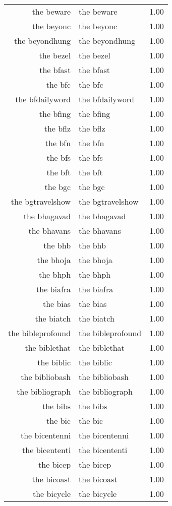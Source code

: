 \begin{table}[ht]
\begin{tabular}{rlr}
  the beware & the beware & 1.00 \\ 
  the beyonc & the beyonc & 1.00 \\ 
  the beyondhung & the beyondhung & 1.00 \\ 
  the bezel & the bezel & 1.00 \\ 
  the bfast & the bfast & 1.00 \\ 
  the bfc & the bfc & 1.00 \\ 
  the bfdailyword & the bfdailyword & 1.00 \\ 
  the bfing & the bfing & 1.00 \\ 
  the bflz & the bflz & 1.00 \\ 
  the bfn & the bfn & 1.00 \\ 
  the bfs & the bfs & 1.00 \\ 
  the bft & the bft & 1.00 \\ 
  the bgc & the bgc & 1.00 \\ 
  the bgtravelshow & the bgtravelshow & 1.00 \\ 
  the bhagavad & the bhagavad & 1.00 \\ 
  the bhavans & the bhavans & 1.00 \\ 
  the bhb & the bhb & 1.00 \\ 
  the bhoja & the bhoja & 1.00 \\ 
  the bhph & the bhph & 1.00 \\ 
  the biafra & the biafra & 1.00 \\ 
  the bias & the bias & 1.00 \\ 
  the biatch & the biatch & 1.00 \\ 
  the bibleprofound & the bibleprofound & 1.00 \\ 
  the biblethat & the biblethat & 1.00 \\ 
  the biblic & the biblic & 1.00 \\ 
  the bibliobash & the bibliobash & 1.00 \\ 
  the bibliograph & the bibliograph & 1.00 \\ 
  the bibs & the bibs & 1.00 \\ 
  the bic & the bic & 1.00 \\ 
  the bicentenni & the bicentenni & 1.00 \\ 
  the bicententi & the bicententi & 1.00 \\ 
  the bicep & the bicep & 1.00 \\ 
  the bicoast & the bicoast & 1.00 \\ 
  the bicycle & the bicycle & 1.00 \\ 

\end{tabular}
\end{table}
